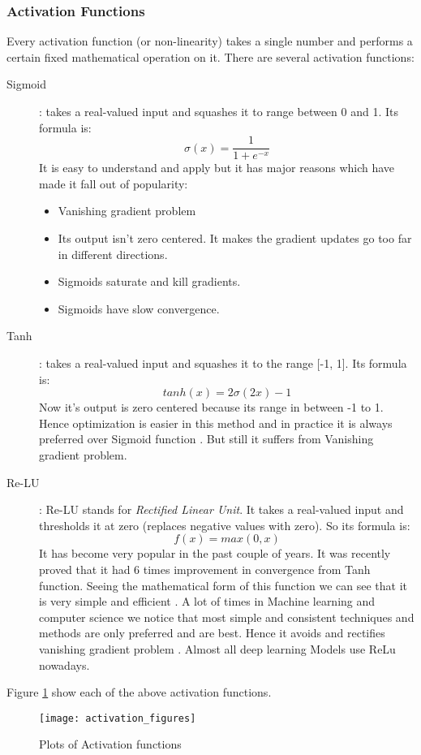 \subsubsection{Activation Functions} 
Every activation function (or non-linearity) takes a single number and performs a certain fixed mathematical operation on it. There are
several activation functions:
\begin{description}
\item[ Sigmoid ] : takes a real-valued input and squashes it to range between 0 and 1. Its formula is:
  \[ \sigma(x) = \frac{1}{1 + e^{-x} } \]
  It is easy to understand and apply but it has major reasons which have made it fall out of popularity:
  \begin{itemize}
  \item Vanishing gradient problem
  \item Its output isn’t zero centered. It makes the gradient updates go too far in different directions.
  \item Sigmoids saturate and kill gradients.
  \item Sigmoids have slow convergence.
  \end{itemize}

\item [ Tanh ] : takes a real-valued input and squashes it to the range [-1, 1]. Its formula is:
  \[ tanh(x) = 2 \sigma(2x) -1 \]
  Now it’s output is zero centered because its range in between -1 to 1. Hence optimization is easier in this method and  in practice it is always preferred over Sigmoid function . But still it suffers from Vanishing gradient problem.

\item[ Re-LU ]: Re-LU stands for \textit{Rectified Linear Unit}. It takes a real-valued input and thresholds it at zero (replaces negative values with zero). So its formula is:
  \[ f(x) = max(0,x) \]
  It has become very popular in the past couple of years. It was recently proved that it had 6 times improvement in convergence from Tanh
  function. Seeing the mathematical form of this function we can see that it is very simple and efficient . A lot of times in Machine
  learning and computer science we notice that most simple and consistent techniques and methods are only preferred and are best.
  Hence it avoids and rectifies vanishing gradient problem . Almost all deep learning Models use ReLu nowadays.
\end{description}

Figure \ref{fig:Activation}  show each of the above activation functions.
\begin{figure}[h]
  \centering
  \texttt{[image: activation\_figures]}
  \caption{Plots of Activation functions}
  \label{fig:Activation}
\end{figure}

